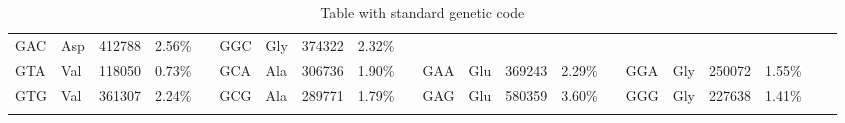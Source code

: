 \begin{table}
\begin{center}
{\begin{tabular}{*{21}{l}}
GAC & Asp & 412788	& 2.56\%	&	&
GGC & Gly & 374322	& 2.32\%	&	&
\\
GTA & Val & 118050	& 0.73\%	&	&
GCA & Ala & 306736	& 1.90\%	&	&
GAA & Glu & 369243	& 2.29\%&	&
GGA & Gly & 250072	& 1.55\%	&	&
\\
GTG & Val & 361307	& 2.24\%	&	&
GCG & Ala & 289771	& 1.79\%	&	&
GAG & Glu & 580359	& 3.60\%	&	&
GGG & Gly & 227638	& 1.41\%	&	&
\\
\\
\hline
\end{tabular}
\caption[Genetic code table]{Table with standard genetic code}
\label{tab:sgencod}
}
\end{center}
\end{table}


